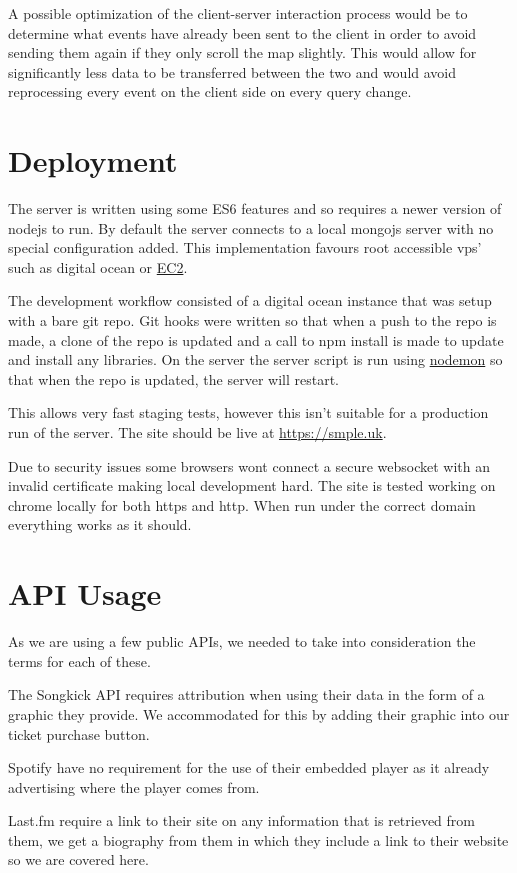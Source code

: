 \documentclass[10pt]{article}
\begin{document}
        A possible optimization of the client-server interaction process would be to determine what events have already been sent to the client in order to avoid sending them again if they only scroll the map slightly. This would allow for significantly less data to be transferred between the two and would avoid reprocessing every event on the client side on every query change.


    \section{Deployment}
        The server is written using some ES6 features and so requires a newer version of nodejs to run. By default the server connects to a local mongojs server with no special configuration added. This implementation favours root accessible vps' such as digital ocean or \href{https://aws.amazon.com/ec2/}{EC2}.

        The development workflow consisted of a digital ocean instance that was setup with a bare git repo. Git hooks were written so that when a push to the repo is made, a clone of the repo is updated and a call to npm install is made to update and install any libraries. On the server the server script is run using \href{https://github.com/remy/nodemon}{nodemon} so that when the repo is updated, the server will restart.

        This allows very fast staging tests, however this isn't suitable for a production run of the server. The site should be live at \href{https://smple.uk}{https://smple.uk}.

        Due to security issues some browsers wont connect a secure websocket with an invalid certificate making local development hard. The site is tested working on chrome locally for both https and http. When run under the correct domain everything works as it should.

    \section{API Usage}
        As we are using a few public APIs, we needed to take into consideration the terms for each of these.

        The Songkick API requires attribution when using their data in the form of a graphic they provide. We accommodated for this by adding their graphic into our ticket purchase button.

        Spotify have no requirement for the use of their embedded player as it already advertising where the player comes from.

        Last.fm require a link to their site on any information that is retrieved from them, we get a biography from them in which they include a link to their website so we are covered here.
\end{document}
